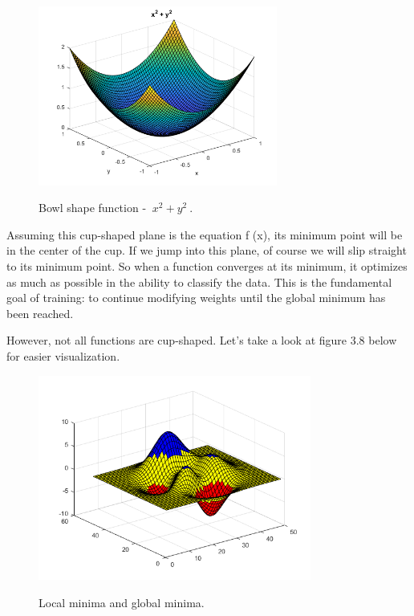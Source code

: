 	\begin{figure}[H]
		\centering
		{\includegraphics[width=0.7\textwidth]{./hinhanh/chap3/bowl_shape.png}}
		\caption[bowl]{Bowl shape function - $ \ {x^2} + {y^2} \ $.}
	\end{figure}
	
	Assuming this cup-shaped plane is the equation f (x), its minimum point will be in the center of the cup. If we jump into this plane, of course we will slip straight to its minimum point. So when a function converges at its minimum, it optimizes as much as possible in the ability to classify the data. This is the fundamental goal of training: to continue modifying weights until the global minimum has been reached.
	
	However, not all functions are cup-shaped. Let's take a look at figure 3.8 below for easier visualization.
	
	\begin{figure}[H]
		\centering
		{\includegraphics[width=0.8\textwidth]{./hinhanh/chap3/global.png}}
		\caption{Local minima and global minima.}
	\end{figure}
	
